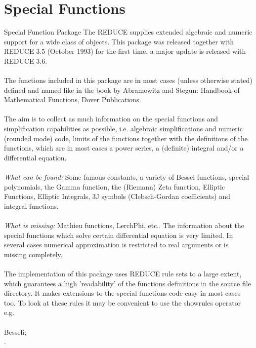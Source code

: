 \section{Special Functions}
\begin{Introduction}{Special Function Package}
The REDUCE  supplies extended
algebraic and numeric support for a wide class of objects.
This package was released together with REDUCE 3.5 (October 1993)
for the first time, a major update is released with REDUCE 3.6.\\
\\

The functions included in this package are in most cases (unless otherwise
stated) defined and named like in the book by Abramowitz and Stegun:
Handbook of Mathematical Functions, Dover Publications.\\
 \\

The aim is to collect as much information on the special functions
and simplification capabilities as possible,
i.e. algebraic simplifications and numeric (rounded mode) code, limits
of the functions together
with the definitions of the functions, which are in most cases a power 
series, a (definite) integral and/or a differential equation.\\
 \\

{\em What can be found:} Some famous constants, a variety of Bessel functions,
special polynomials,
the Gamma function, the (Riemann) Zeta function, Elliptic Functions, Elliptic
Integrals, 3J symbols (Clebsch-Gordan coefficients) and integral functions.\\
 \\

{\em What is missing:} Mathieu functions, LerchPhi, etc..
The information about the special functions which solve certain
differential equation is very limited.
In several cases numerical approximation is restricted to real
arguments or is missing completely.\\
 \\

The implementation of this package uses REDUCE rule sets to a large extent,
which guarantees a high 'readability' of the functions definitions in the
source file directory. It makes extensions to the special
functions code easy in most cases too. To look at these rules
it may be convenient to use the showrules operator e.g.\\
 \\
  Besseli;\\
.\\


\end{Introduction}
